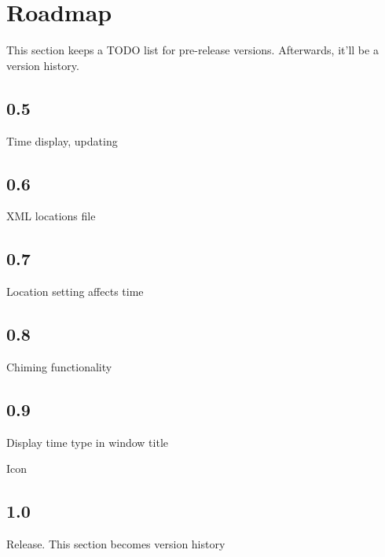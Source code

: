\section{Roadmap}

This section keeps a TODO list for pre-release versions. Afterwards, it'll be a version history.


\subsection{0.5}

Time display, updating

\subsection{0.6}

XML locations file

\subsection{0.7}

Location setting affects time

\subsection{0.8}

Chiming functionality

\subsection{0.9}

Display time type in window title

Icon

\subsection{1.0}

Release. This section becomes version history

